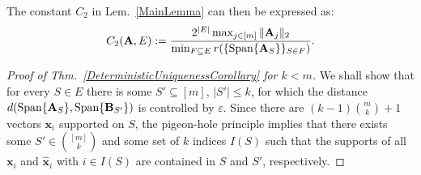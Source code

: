 \documentclass[9pt,twocolumn]{pnas-new}
\begin{document}
The constant $C_2$ in Lem.~\ref{MainLemma} can then be expressed as:  %
\begin{align}\label{Cdef2}
C_2(\mathbf{A}, E) := \frac{ 2^{|E|} \max_{j \in [m]} \|\mathbf{A}_j\|_2}{ \min_{F \subseteq E} r( \{ \text{\rm Span}\{\mathbf{A}_{S}\} \}_{S \in F}) }.
\end{align}

\begin{proof}[Proof of Thm.~\ref{DeterministicUniquenessCorollary} for $k < m$] 
We shall show that for every $S \in E$ there is some $S' \subseteq [m]$, $|S'| \leq k$, for which the distance $d(\text{\rm Span}\{\mathbf{A}_S\}, \text{\rm Span}\{\mathbf{B}_{S'}\})$ is controlled by $\varepsilon$. Since there are $(k-1){m \choose k}+1$ vectors $\mathbf{x}_i$ supported on $S$, the pigeon-hole principle implies that there exists some $S' \in {[m] \choose k}$ and some set of $k$ indices $I(S)$ such that the supports of all $\mathbf{x}_i$ and $\mathbf{\hat x}_i$ with $i \in I(S)$ are contained in $S$ and $S'$, respectively.


\end{proof}
\end{document}
